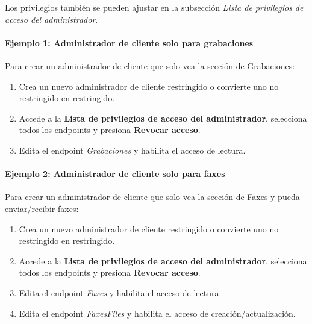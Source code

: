 \documentclass[letterpaper,10pt,spanish]{sphinxmanual}
\begin{document}
Los privilegios también se pueden ajustar en la subsección \emph{Lista de privilegios de acceso del administrador}.
\paragraph{Ejemplo 1: Administrador de cliente solo para grabaciones}

Para crear un administrador de cliente que solo vea la sección de Grabaciones:
\begin{enumerate}
\item {} 
Crea un nuevo administrador de cliente restringido o convierte uno no restringido en restringido.

\item {} 
Accede a la \textbf{Lista de privilegios de acceso del administrador}, selecciona todos los endpoints y presiona \textbf{Revocar acceso}.

\item {} 
Edita el endpoint \emph{Grabaciones} y habilita el acceso de lectura.

\end{enumerate}
\paragraph{Ejemplo 2: Administrador de cliente solo para faxes}

Para crear un administrador de cliente que solo vea la sección de Faxes y pueda enviar/recibir faxes:
\begin{enumerate}
\item {} 
Crea un nuevo administrador de cliente restringido o convierte uno no restringido en restringido.

\item {} 
Accede a la \textbf{Lista de privilegios de acceso del administrador}, selecciona todos los endpoints y presiona \textbf{Revocar acceso}.

\item {} 
Edita el endpoint \emph{Faxes} y habilita el acceso de lectura.

\item {} 
Edita el endpoint \emph{FaxesFiles} y habilita el acceso de creación/actualización.

\end{enumerate}



\renewcommand{\indexname}{Índice}
\printindex
\end{document}
